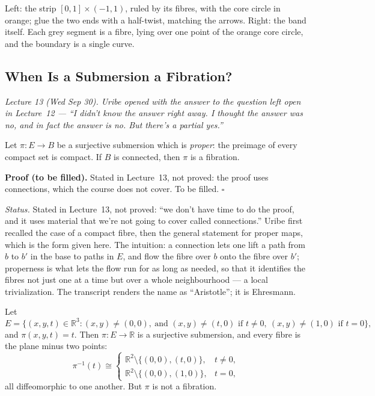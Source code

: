 \documentclass[11pt]{report}
\makeatletter
\newcounter{thmcounter}[section]
\newcounter{excounter}[section]
\renewenvironment{proof}[1][Proof]{\noindent\textbf{#1.} }{\hfill$\square$\par\vspace{5pt}}
\newcommand{\thmlabel}[1]{\edef\@currentlabel{\arabic{section}.\arabic{thmcounter}}\label{#1}}
\newcommand{\exlabel}[1]{\edef\@currentlabel{\arabic{section}.\arabic{excounter}}\label{#1}}
\makeatother
\begin{document}
Left: the strip $[0, 1] \times (-1, 1)$, ruled by its fibres, with the core circle in orange; glue the two ends with a half-twist, matching the arrows. Right: the band itself. Each grey segment is a fibre, lying over one point of the orange core circle, and the boundary is a single curve.


\subsection{When Is a Submersion a Fibration?}\label{sub:ehresmann}

\textit{Lecture 13 (Wed Sep 30). Uribe opened with the answer to the question left open in Lecture~12 --- ``I didn't know the answer right away. I thought the answer was no, and in fact the answer is no. But there's a partial yes.''}

\begin{thmbox}\thmlabel{thm:ehresmann}
Let $\pi : E \to B$ be a surjective submersion which is \emph{proper}: the preimage of every compact set is compact. If $B$ is connected, then $\pi$ is a fibration.
\end{thmbox}

\begin{proof}[Proof (to be filled)]
Stated in Lecture~13, not proved: the proof uses connections, which the course does not cover. To be filled.
\end{proof}

\textit{Status.} Stated in Lecture~13, not proved: ``we don't have time to do the proof, and it uses material that we're not going to cover called connections.'' Uribe first recalled the case of a compact fibre, then the general statement for proper maps, which is the form given here. The intuition: a connection lets one lift a path from $b$ to $b'$ in the base to paths in $E$, and flow the fibre over $b$ onto the fibre over $b'$; properness is what lets the flow run for as long as needed, so that it identifies the fibres not just one at a time but over a whole neighbourhood --- a local trivialization. The transcript renders the name as ``Aristotle''; it is Ehresmann.

\begin{exbox}\exlabel{ex:ehresmann-counter}
Let
\[
E = \big\{ (x, y, t) \in \mathbb{R}^3 : (x, y) \ne (0, 0), \ \text{and } (x, y) \ne (t, 0) \text{ if } t \ne 0, \ (x, y) \ne (1, 0) \text{ if } t = 0 \big\},
\]
and $\pi(x, y, t) = t$. Then $\pi : E \to \mathbb{R}$ is a surjective submersion, and every fibre is the plane minus two points:
\[
\pi^{-1}(t) \cong \begin{cases} \mathbb{R}^2 \setminus \{(0,0), (t,0)\}, & t \ne 0, \\ \mathbb{R}^2 \setminus \{(0,0), (1,0)\}, & t = 0, \end{cases}
\]
all diffeomorphic to one another. But $\pi$ is not a fibration.
\end{exbox}
\end{document}
